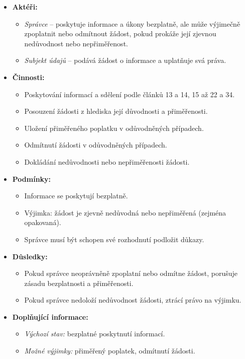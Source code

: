 \begin{itemize}
\item \textbf{Aktéři:}
\begin{itemize}
\item \textit{Správce} – poskytuje informace a úkony bezplatně, ale může výjimečně zpoplatnit nebo odmítnout žádost, pokud prokáže její zjevnou nedůvodnost nebo nepřiměřenost.
\item \textit{Subjekt údajů} – podává žádost o informace a uplatňuje svá práva.
\end{itemize}

\item \textbf{Činnosti:}
\begin{itemize}
\item Poskytování informací a sdělení podle článků 13 a 14, 15 až 22 a 34.
\item Posouzení žádosti z hlediska její důvodnosti a přiměřenosti.
\item Uložení přiměřeného poplatku v odůvodněných případech.
\item Odmítnutí žádosti v odůvodněných případech.
\item Dokládání nedůvodnosti nebo nepřiměřenosti žádosti.
\end{itemize}

\item \textbf{Podmínky:}
\begin{itemize}
\item Informace se poskytují bezplatně.
\item Výjimka: žádost je zjevně nedůvodná nebo nepřiměřená (zejména opakovaná).
\item Správce musí být schopen své rozhodnutí podložit důkazy.
\end{itemize}

\item \textbf{Důsledky:}
\begin{itemize}
\item Pokud správce neoprávněně zpoplatní nebo odmítne žádost, porušuje zásadu bezplatnosti a přiměřenosti.
\item Pokud správce nedoloží nedůvodnost žádosti, ztrácí právo na výjimku.
\end{itemize}

\item \textbf{Doplňující informace:}
\begin{itemize}
\item \textit{Výchozí stav:} bezplatné poskytnutí informací.
\item \textit{Možné výjimky:} přiměřený poplatek, odmítnutí žádosti.

\end{itemize}
\end{itemize}

